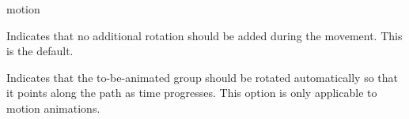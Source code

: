 \begin{sysanimateattribute}{motion}
    \begin{command}{\pgfsysanimkeynorotatealong}
    \end{command}
    \begin{command}{\pgfsys@animation@norotatealong}
        Indicates that no additional rotation should be added during the
        movement. This is the default.
    \end{command}

    \begin{command}{\pgfsysanimkeyrotatealong}
    \end{command}
    \begin{command}{\pgfsys@animation@rotatealong}
        Indicates that the to-be-animated group should be rotated automatically
        so that it points along the path as time progresses. This option is
        only applicable to motion animations.
\begin{codeexample}[
    preamble={\usetikzlibrary{animations}},
    animation list={0.5,1,1.5,2},
    render instead={
\animationexample{node}{}{
  \pgfsysanimkeyrotatealong
  \pgfsysanimkeymovealong{
    \pgfsyssoftpath@movetotoken{0pt}{0pt}
    \pgfsyssoftpath@linetotoken{0pt}{-5mm}
    \pgfsyssoftpath@curvetosupportatoken{0pt}{-1cm}%
    \pgfsyssoftpath@curvetosupportbtoken{0pt}{-1cm}%
    \pgfsyssoftpath@curvetotoken{-5mm}{-1cm} }
  \pgfsysanimkeytime{0}{1}{1}{0}{0}
  \pgfsysanimvalscalar{0}
  \pgfsysanimkeytime{2}{1}{1}{0}{0}
  \pgfsysanimvalscalar{1}
  \pgfsysanimate{motion}
}}]
\end{codeexample}
    \end{command}
\end{sysanimateattribute}

